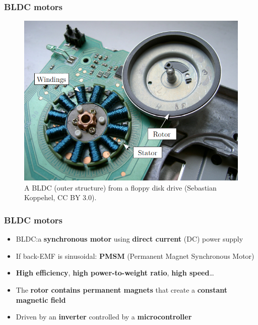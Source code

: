 \documentclass[handout]{beamer}
\begin{document}
\begin{frame}
  \frametitle{BLDC motors}

  \begin{figure}
    \centering
    \includegraphics[scale=0.3]{pmsm-outer.png}
    \caption{A BLDC (outer structure) from a floppy disk drive (Sebastian
      Koppehel, CC BY 3.0).}
  \end{figure}
\end{frame}

\begin{frame}
  \frametitle{BLDC motors}

  \begin{itemize}
    \item<1-> BLDC:\@ a \textbf{synchronous motor} using \textbf{direct current}
          (DC) power supply
    \item<2-> If back-EMF is sinusoidal: \textbf{PMSM} (Permanent Magnet
          Synchronous Motor)
    \item<3-> \textbf{High efficiency}, \textbf{high power-to-weight ratio},
          \textbf{high speed}\ldots
    \item<4-> The \textbf{rotor contains permanent magnets} that create a
          \textbf{constant magnetic field}
    \item<5-> Driven by an \textbf{inverter} controlled by a
          \textbf{microcontroller}
  \end{itemize}
\end{frame}
\end{document}
